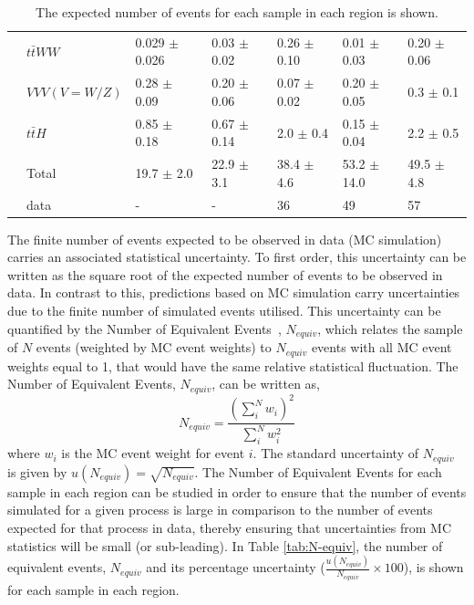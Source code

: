 \begin{table}[h!]
{\begin{tabular}{|ll|l|l|l|l|l|}
\multicolumn{1}{|l|}{}                       & $t\bar{t}WW$         & 0.029 $\pm$ 0.026     & 0.03 $\pm$ 0.02   & 0.26 $\pm$ 0.10    & 0.01 $\pm$ 0.03    & 0.20 $\pm$ 0.06   \\
\multicolumn{1}{|l|}{}                       & $VVV (V = W/Z)$           & 0.28 $\pm$ 0.09     & 0.20 $\pm$ 0.06    & 0.07 $\pm$ 0.02  & 0.20 $\pm$ 0.05   & 0.3 $\pm$ 0.1   \\
\multicolumn{1}{|l|}{}                       & $t\bar{t}H$          & 0.85 $\pm$ 0.18       & 0.67 $\pm$ 0.14     & 2.0 $\pm$ 0.4     & 0.15 $\pm$ 0.04    & 2.2 $\pm$ 0.5      \\ \hline
                                             & Total        & 19.7 $\pm$ 2.0         & 22.9 $\pm$ 3.1       & 38.4 $\pm$ 4.6       & 53.2 $\pm$ 14.0       & 49.5 $\pm$ 4.8      \\ \hline
                                             & data         & -                                         & -                                       & 36                                      & 49                                       & 57                                      \\ \hline
\end{tabular}}
\caption{The expected number of events for each sample in each region is shown.}
\label{tab:4Lep-PreFit-Yields}
\end{table}
The finite number of events expected to be observed in data (MC simulation) carries an associated statistical uncertainty. To first order, this uncertainty can be written as the square root of the expected number of events to be observed in data. In contrast to this, predictions based on MC simulation carry uncertainties due to the finite number of simulated events utilised. This uncertainty can be quantified by the Number of Equivalent Events~\cite{N_equiv_Derivation}, $N_{equiv}$, which relates the sample of $N$ events (weighted by MC event weights) to $N_{equiv}$ events with all MC event weights equal to 1, that would have the same relative statistical fluctuation. The Number of Equivalent Events, $N_{equiv}$, can be written as,
\begin{equation}
N_{equiv} = \frac{ (\sum_{i}^{N} w_{i})^2  }{\sum_{i}^{N} w_i^2 }
\end{equation}
where $w_i$ is the MC event weight for event $i$. The standard uncertainty of $N_{equiv}$ is given by $u(N_{equiv}) = \sqrt{N_{equiv}}$. The Number of Equivalent Events for each sample in each region can be studied in order to ensure that the number of events simulated for a given process is large in comparison to the number of events expected for that process in data, thereby ensuring that uncertainties from MC statistics will be small (or sub-leading). In Table \ref{tab:N-equiv}, the number of equivalent events, $N_{equiv}$ and its percentage uncertainty ($\frac{u(N_{equiv})}{N_{equiv}}\times 100$), is shown for each sample in each region. 
